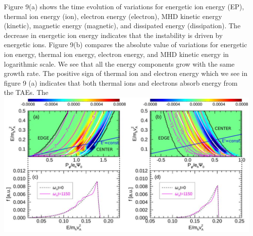 \documentclass[10pt]{article}
\begin{document}
Figure 9(a) shows the time evolution of variations for energetic ion energy (EP), thermal ion energy (ion), electron energy (electron), MHD kinetic energy (kinetic), magnetic energy (magnetic), and dissipated energy (dissipation). The decrease in energetic ion energy indicates that the instability is driven by energetic ions. Figure 9(b) compares the absolute value of variations for energetic ion energy, thermal ion energy, electron energy, and MHD kinetic energy in logarithmic scale. We see that all the energy components grow with the same growth rate. The positive sign of thermal ion and electron energy which we see in figure 9 (a) indicates that both thermal ions and electrons absorb energy from the TAEs. The
\includegraphics[max width=\textwidth, center]{2023_06_04_de2f4b8aa3fd859f006dg-11}
\end{document}
